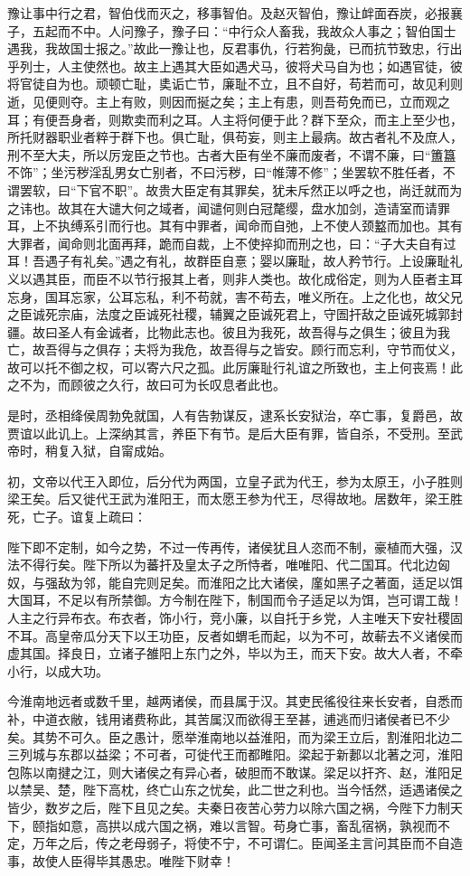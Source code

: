 \documentclass[]{article}
\begin{document}
豫让事中行之君，智伯伐而灭之，移事智伯。及赵灭智伯，豫让衅面吞炭，必报襄子，五起而不中。人问豫子，豫子曰：``中行众人畜我，我故众人事之；智伯国士遇我，我故国士报之。''故此一豫让也，反君事仇，行若狗彘，已而抗节致忠，行出乎列士，人主使然也。故主上遇其大臣如遇犬马，彼将犬马自为也；如遇官徒，彼将官徒自为也。顽顿亡耻，奊诟亡节，廉耻不立，且不自好，苟若而可，故见利则逝，见便则夺。主上有败，则因而挻之矣；主上有患，则吾苟免而已，立而观之耳；有便吾身者，则欺卖而利之耳。人主将何便于此？群下至众，而主上至少也，所托财器职业者粹于群下也。俱亡耻，俱苟妄，则主上最病。故古者礼不及庶人，刑不至大夫，所以厉宠臣之节也。古者大臣有坐不廉而废者，不谓不廉，曰``簠簋不饰''；坐污秽淫乱男女亡别者，不曰污秽，曰``帷薄不修''；坐罢软不胜任者，不谓罢软，曰``下官不职''。故贵大臣定有其罪矣，犹未斥然正以呼之也，尚迁就而为之讳也。故其在大谴大何之域者，闻谴何则白冠氂缨，盘水加剑，造请室而请罪耳，上不执缚系引而行也。其有中罪者，闻命而自弛，上不使人颈盭而加也。其有大罪者，闻命则北面再拜，跪而自裁，上不使捽抑而刑之也，曰：``子大夫自有过耳！吾遇子有礼矣。''遇之有礼，故群臣自憙；婴以廉耻，故人矜节行。上设廉耻礼义以遇其臣，而臣不以节行报其上者，则非人类也。故化成俗定，则为人臣者主耳忘身，国耳忘家，公耳忘私，利不苟就，害不苟去，唯义所在。上之化也，故父兄之臣诚死宗庙，法度之臣诚死社稷，辅翼之臣诚死君上，守圄扞敌之臣诚死城郭封疆。故曰圣人有金诚者，比物此志也。彼且为我死，故吾得与之俱生；彼且为我亡，故吾得与之俱存；夫将为我危，故吾得与之皆安。顾行而忘利，守节而仗义，故可以托不御之权，可以寄六尺之孤。此厉廉耻行礼谊之所致也，主上何丧焉！此之不为，而顾彼之久行，故曰可为长叹息者此也。

是时，丞相绛侯周勃免就国，人有告勃谋反，逮系长安狱治，卒亡事，复爵邑，故贾谊以此讥上。上深纳其言，养臣下有节。是后大臣有罪，皆自杀，不受刑。至武帝时，稍复入狱，自甯成始。

初，文帝以代王入即位，后分代为两国，立皇子武为代王，参为太原王，小子胜则梁王矣。后又徙代王武为淮阳王，而太愿王参为代王，尽得故地。居数年，梁王胜死，亡子。谊复上疏曰：

陛下即不定制，如今之势，不过一传再传，诸侯犹且人恣而不制，豪植而大强，汉法不得行矣。陛下所以为蕃扞及皇太子之所恃者，唯唯阳、代二国耳。代北边匈奴，与强敌为邻，能自完则足矣。而淮阳之比大诸侯，廑如黑子之著面，适足以饵大国耳，不足以有所禁御。方今制在陛下，制国而令子适足以为饵，岂可谓工哉！人主之行异布衣。布衣者，饰小行，竞小廉，以自托于乡党，人主唯天下安社稷固不耳。高皇帝瓜分天下以王功臣，反者如蝟毛而起，以为不可，故蔪去不义诸侯而虚其国。择良日，立诸子雒阳上东门之外，毕以为王，而天下安。故大人者，不牵小行，以成大功。

今淮南地远者或数千里，越两诸侯，而县属于汉。其吏民徭役往来长安者，自悉而补，中道衣敝，钱用诸费称此，其苦属汉而欲得王至甚，逋逃而归诸侯者已不少矣。其势不可久。臣之愚计，愿举淮南地以益淮阳，而为梁王立后，割淮阳北边二三列城与东郡以益梁；不可者，可徙代王而都睢阳。梁起于新郪以北著之河，淮阳包陈以南揵之江，则大诸侯之有异心者，破胆而不敢谋。梁足以扞齐、赵，淮阳足以禁吴、楚，陛下高枕，终亡山东之忧矣，此二世之利也。当今恬然，适遇诸侯之皆少，数岁之后，陛下且见之矣。夫秦日夜苦心劳力以除六国之祸，今陛下力制天下，颐指如意，高拱以成六国之祸，难以言智。苟身亡事，畜乱宿祸，孰视而不定，万年之后，传之老母弱子，将使不宁，不可谓仁。臣闻圣主言问其臣而不自造事，故使人臣得毕其愚忠。唯陛下财幸！
\end{document}
